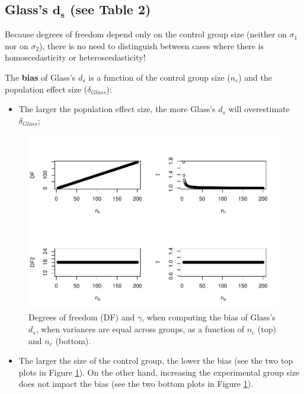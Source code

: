 \documentclass[
  english,
  man,mask]{apa6}
\providecommand{\tightlist}{%
  \setlength{\itemsep}{0pt}\setlength{\parskip}{0pt}}
\begin{document}
\hypertarget{glasss-bmd_s-see-table-2}{%
\subsection{\texorpdfstring{Glass's \(\bm{d_s}\) (see Table 2)}{Glass's \textbackslash bm\{d\_s\} (see Table 2)}}\label{glasss-bmd_s-see-table-2}}

Because degrees of freedom depend only on the control group size (neither on \(\sigma_1\) nor on \(\sigma_2\)), there is no need to distinguish between cases where there is homoscedasticity or heteroscedasticity!

The \textbf{bias} of Glass's \(d_s\) is a function of the control group size (\(n_c\)) and the population effect size (\(\delta_{Glass}\)):

\begin{itemize}
\tightlist
\item
  The larger the population effect size, the more Glass's \(d_s\) will overestimate \(\delta_{Glass}\);
\end{itemize}

\begin{figure}
\centering
\includegraphics{Theoretical-Bias-of-all-estimators-as-a-function-of-population-parameters_files/figure-latex/biasGlassctrlsize2-1.pdf}
\caption{\label{fig:biasGlassctrlsize2}Degrees of freedom (DF) and \(\gamma\), when computing the bias of Glass's \(d_s\), when variances are equal across groups, as a function of \(n_c\) (top) and \(n_e\) (bottom).}
\end{figure}

\begin{itemize}
\tightlist
\item
  The larger the size of the control group, the lower the bias (see the two top plots in Figure \ref{fig:biasGlassctrlsize2}). On the other hand, increasing the experimental group size does not impact the bias (see the two bottom plots in Figure \ref{fig:biasGlassctrlsize2}).
\end{itemize}
\end{document}
